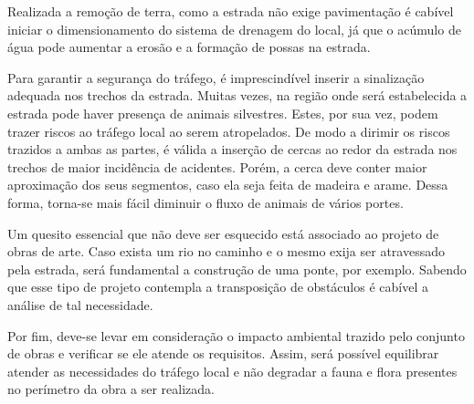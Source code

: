 Realizada a remoção de terra, como a estrada não exige pavimentação é cabível iniciar o dimensionamento do sistema de drenagem do local, já que o acúmulo de água pode aumentar a erosão e a formação de possas na estrada.

Para garantir a segurança do tráfego, é imprescindível inserir a sinalização adequada nos trechos da estrada. Muitas vezes, na região onde será estabelecida a estrada pode haver presença de animais silvestres. Estes, por sua vez, podem trazer riscos ao tráfego local ao serem atropelados. De modo a dirimir os riscos trazidos a ambas as partes, é válida a inserção de cercas ao redor da estrada nos trechos de maior incidência de acidentes. Porém, a cerca deve conter maior aproximação dos seus segmentos, caso ela seja feita de madeira e arame. Dessa forma, torna-se mais fácil diminuir o fluxo de animais de vários portes. 
 
Um quesito essencial que não deve ser esquecido está associado ao projeto de obras de arte. Caso exista um rio no caminho e o mesmo exija ser atravessado pela estrada, será fundamental a construção de uma ponte, por exemplo. Sabendo que esse tipo de projeto contempla a transposição de obstáculos é cabível a análise de tal necessidade.

Por fim, deve-se levar em consideração o impacto ambiental trazido pelo conjunto de obras e verificar se ele atende os requisitos. Assim, será possível equilibrar atender as necessidades do tráfego local e não degradar a fauna e flora presentes no perímetro da obra a ser realizada.